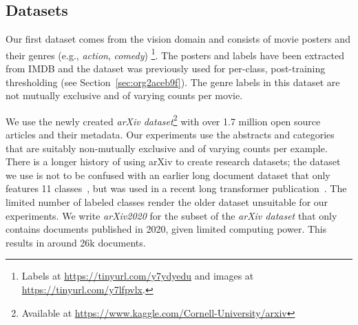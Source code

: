 \subsection{Datasets}

Our first dataset \citep{moviePosters} comes from the vision domain and consists of movie posters and their genres (e.g., \emph{action}, \emph{comedy}) \footnote{Labels at \url{https://tinyurl.com/y7ydyedu} and images at \url{https://tinyurl.com/y7lfpvlx}.}. The posters and labels have been extracted from IMDB and the dataset was previously used for per-class, post-training thresholding (see Section~\ref{sec:org2aceb9f}). The genre labels in this dataset are not mutually exclusive and of varying counts per movie.

We use the newly created \emph{arXiv dataset}\footnote{Available at \url{https://www.kaggle.com/Cornell-University/arxiv}} with over 1.7 million open source articles and their metadata. Our experiments use the abstracts and categories that are suitably non-mutually exclusive and of varying counts per example. There is a longer history of using arXiv to create research datasets; the dataset we use is not to be confused with an earlier long document dataset that only features 11 classes~\citep{oldarXiv}, but was used in a recent long transformer publication~\cite{bigBird}. The limited number of labeled classes render the older dataset unsuitable for our experiments.  We write \textit{arXiv2020} for the subset of the \emph{arXiv dataset} that only contains documents published in 2020, given limited computing power. This results in around 26k documents.

